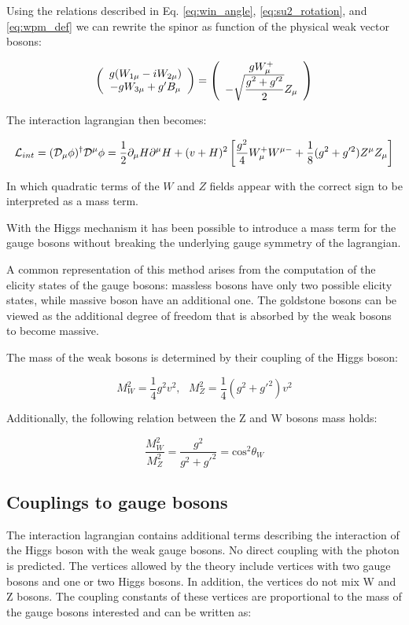 Using the relations described in Eq. \ref{eq:win_angle}, \ref{eq:su2_rotation}, and \ref{eq:wpm_def} we can rewrite the spinor as function of the physical weak vector bosons:

\begin{equation}
\left(\begin{array}{c}g(W_{1\mu} - i W_{2\mu}) \\-g W_{3\mu} + g'B_\mu\end{array}\right) = \left(\begin{array}{c}gW^+_{\mu} \\-\sqrt{\dfrac{g^2+g'^2}{2}}Z_\mu\end{array}\right)
\end{equation}

The interaction lagrangian then becomes:

\begin{equation}
\mathcal{L}_{int} = (\mathcal{D}_\mu\phi)^\dagger\mathcal{D}^\mu\phi = \frac{1}{2}\partial_{\mu}H\partial^{\mu}H+(v+H)^2\left[\frac{g^2}{4}W^+_{\mu}W^{\mu-} + \frac{1}{8}(g^2+g'^2) Z^{\mu}Z_{\mu}\right ]
\end{equation}

In which quadratic terms of the $W$ and $Z$ fields appear with the correct sign to be interpreted as a mass term. 

With the Higgs mechanism it has been possible to introduce a mass term for the gauge bosons without breaking the underlying gauge symmetry of the lagrangian. 

A common representation of this method arises from the computation of the elicity states of the gauge bosons: massless bosons have only two possible elicity states, while massive boson have an additional one. The goldstone bosons can be viewed as the additional degree of freedom that is absorbed by the weak bosons to become massive.

The mass of the weak bosons is determined by their coupling of the Higgs boson: 

\begin{equation}
M^2_W=\frac{1}{4}g^2v^2, \, \, \, \, M^2_Z=\frac{1}{4}(g^2+g'^2)v^2
\end{equation}

Additionally, the following relation between the Z and W bosons mass holds:

\begin{equation}
\frac{M_W^2}{M_Z^2}=\frac{g^2}{g^2+g'^2}=\operatorname{cos^2}\theta_W
\end{equation}

\subsection{Couplings to gauge bosons}

The interaction lagrangian contains additional terms describing the interaction of the Higgs boson with the weak gauge bosons. No direct coupling with the photon is predicted. The vertices allowed by the theory include vertices with two gauge bosons and one or two Higgs bosons. In addition, the vertices do not mix W and Z bosons. The coupling constants of these vertices are proportional to the mass of the gauge bosons interested and can be written as:

